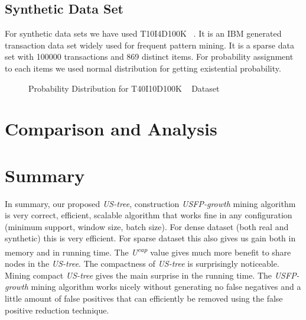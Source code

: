 \subsection{Synthetic Data Set}
For synthetic data sets we have used T10I4D100K ~\cite{dataset}. It is an IBM generated transaction data set widely used for frequent pattern mining. It is a sparse data set with 100000 transactions and 869 distinct items. For probability assignment to each items we used normal distribution for getting existential probability.
		\begin{figure}[h]
		\centering
			
		\caption{Probability Distribution for T40I10D100K ~\cite{dataset} Dataset}
		\label{result:g_dataset_t10}
		\end{figure}
		
		
\clearpage
\section{Comparison and Analysis}
	

\clearpage
\section{Summary}
In summary, our proposed \emph{US-tree}, construction \emph{USFP-growth} mining algorithm is very correct, efficient, scalable algorithm that works fine in any configuration (minimum support, window size, batch size). For dense dataset (both real and synthetic) this is very efficient. For sparse dataset this also gives us gain both in memory and in running time. The \emph{U\textsuperscript{cap}} value gives much more benefit to share nodes in the \emph{US-tree}. The compactness of \emph{US-tree} is surprisingly noticeable. Mining compact \emph{US-tree} gives the main surprise in the running time. The \emph{USFP-growth} mining algorithm works nicely without generating no false negatives and a little amount of false positives that can efficiently be removed using the false positive reduction technique.
%
%